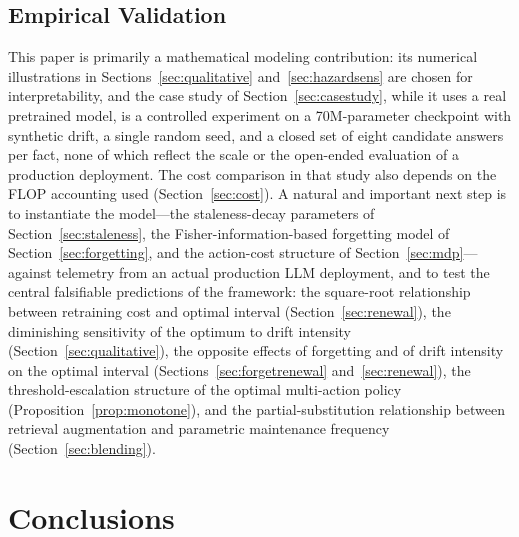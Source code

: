 \documentclass[electronics,article,submit,pdftex,moreauthors]{Definitions/mdpi}
\begin{document}
\subsection{Empirical Validation}\label{sec:validation}

This paper is primarily a mathematical modeling contribution: its numerical illustrations in Sections~\ref{sec:qualitative} and~\ref{sec:hazardsens} are chosen for interpretability, and the case study of Section~\ref{sec:casestudy}, while it uses a real pretrained model, is a controlled experiment on a 70M-parameter checkpoint with synthetic drift, a single random seed, and a closed set of eight candidate answers per fact, none of which reflect the scale or the open-ended evaluation of a production deployment. The cost comparison in that study also depends on the FLOP accounting used (Section~\ref{sec:cost}). A natural and important next step is to instantiate the model---the staleness-decay parameters of Section~\ref{sec:staleness}, the Fisher-information-based forgetting model of Section~\ref{sec:forgetting}, and the action-cost structure of Section~\ref{sec:mdp}---against telemetry from an actual production LLM deployment, and to test the central falsifiable predictions of the framework: the square-root relationship between retraining cost and optimal interval (Section~\ref{sec:renewal}), the diminishing sensitivity of the optimum to drift intensity (Section~\ref{sec:qualitative}), the opposite effects of forgetting and of drift intensity on the optimal interval (Sections~\ref{sec:forgetrenewal} and~\ref{sec:renewal}), the threshold-escalation structure of the optimal multi-action policy (Proposition~\ref{prop:monotone}), and the partial-substitution relationship between retrieval augmentation and parametric maintenance frequency (Section~\ref{sec:blending}).

\section{Conclusions}\label{sec:conclusions}
\end{document}
